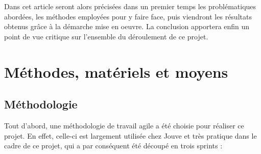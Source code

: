 \documentclass[twocolumn,a4paper]{IEEEtranfr}
\begin{document}
Dans cet article seront alors précisées dans un premier temps les problématiques abordées, les méthodes employées pour y faire face, puis viendront les résultats obtenus grâce à la démarche mise en oeuvre. La conclusion apportera enfin un point de vue critique sur l'ensemble du déroulement de ce projet.

\section{Méthodes, matériels et moyens}

\subsection{Méthodologie}

Tout d'abord, une méthodologie de travail agile a été choisie pour réaliser ce projet. En effet, celle-ci est largement utilisée chez Jouve et très pratique dans le cadre de ce projet, qui a par conséquent été découpé en trois sprints :\\
\end{document}
